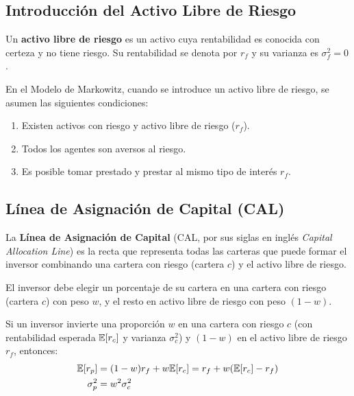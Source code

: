 \subsection{Introducción del Activo Libre de Riesgo}

\begin{definicion}
Un \textbf{activo libre de riesgo} es un activo cuya rentabilidad es conocida con certeza y no tiene riesgo. Su rentabilidad se denota por $r_f$ y su varianza es $\sigma_f^2 = 0$.
\end{definicion}

En el Modelo de Markowitz, cuando se introduce un activo libre de riesgo, se asumen las siguientes condiciones:
\begin{enumerate}
\item Existen activos con riesgo y activo libre de riesgo ($r_f$).
\item Todos los agentes son aversos al riesgo.
\item Es posible tomar prestado y prestar al mismo tipo de interés $r_f$.
\end{enumerate}

\subsection{Línea de Asignación de Capital (CAL)}

\begin{definicion}
La \textbf{Línea de Asignación de Capital} (CAL, por sus siglas en inglés \textit{Capital Allocation Line}) es la recta que representa todas las carteras que puede formar el inversor combinando una cartera con riesgo (cartera $c$) y el activo libre de riesgo.
\end{definicion}

El inversor debe elegir un porcentaje de su cartera en una cartera con riesgo (cartera $c$) con peso $w$, y el resto en activo libre de riesgo con peso $(1-w)$.

\begin{teorema}
Si un inversor invierte una proporción $w$ en una cartera con riesgo $c$ (con rentabilidad esperada $\mathbb{E}[r_c]$ y varianza $\sigma_c^2$) y $(1-w)$ en el activo libre de riesgo $r_f$, entonces:
\begin{align}
\mathbb{E}[r_p] &= (1-w)r_f + w\mathbb{E}[r_c] = r_f + w(\mathbb{E}[r_c] - r_f) \label{eq:cal_return} \\
\sigma_p^2 &= w^2 \sigma_c^2 \label{eq:cal_variance}
\end{align}
\end{teorema}


